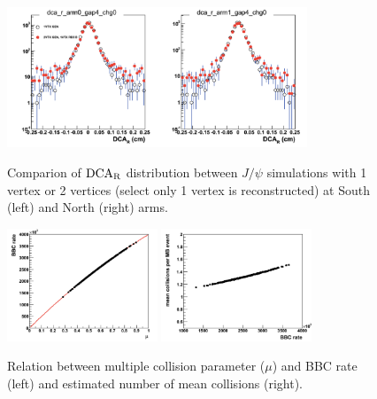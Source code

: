 \documentclass[12pt]{article}
\newcommand{\jpsi}{$J/\psi$ }
\newcommand{\dcar}{$\rm{DCA}_{R}$ }
\begin{document}
\begin{figure}[!h]
\begin{center}
\includegraphics[width=0.8\textwidth,angle=0]{figures/dca_r_1vtx_2vtx_1miss}
\\ \caption{Comparion of \dcar distribution between \jpsi simulations with 1 vertex or 2 vertices (select only 1 vertex is reconstructed) at South (left) and North (right) arms.}
\label{fig:dca_1vtx_2vtx}
\end{center}
\end{figure}

\begin{figure}[!h]
\begin{center}
\includegraphics[width=0.4\textwidth,angle=0]{figures/multi_collision_par_BBC_rate}
\includegraphics[width=0.4\textwidth,angle=0]{figures/mean_collision_per_BBC_rate}
\\ \caption{Relation between multiple collision parameter ($\mu$) and BBC rate (left) and estimated number of mean collisions (right).}
\label{fig:multi_collision}
\end{center}
\end{figure}
\end{document}
